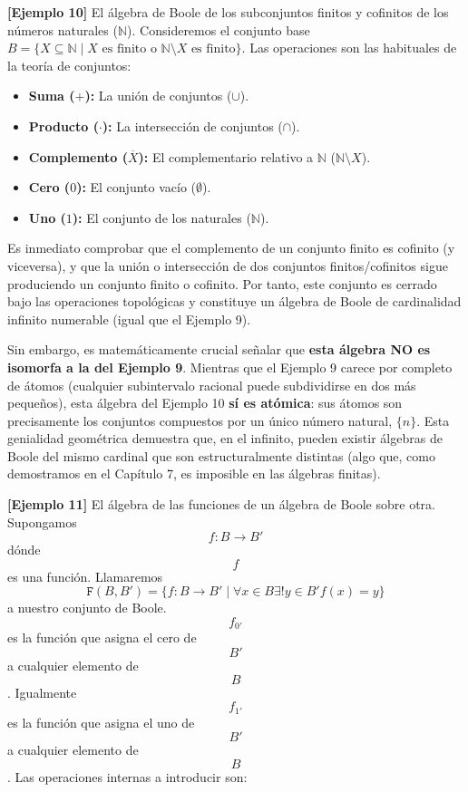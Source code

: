  \textbf{{[}Ejemplo 10{]}} El álgebra de Boole de los subconjuntos finitos y cofinitos de los números naturales ($\mathbb{N}$). Consideremos el conjunto base $B = \{ X \subseteq \mathbb{N} \mid X \text{ es finito o } \mathbb{N} \setminus X \text{ es finito} \}$. Las operaciones son las habituales de la teoría de conjuntos:
  \begin{itemize}
      \item \textbf{Suma ($+$):} La unión de conjuntos ($\cup$).
      \item \textbf{Producto ($\cdot$):} La intersección de conjuntos ($\cap$).
      \item \textbf{Complemento ($\overline{X}$):} El complementario relativo a $\mathbb{N}$ ($\mathbb{N} \setminus X$).
      \item \textbf{Cero ($0$):} El conjunto vacío ($\emptyset$).
      \item \textbf{Uno ($1$):} El conjunto de los naturales ($\mathbb{N}$).
  \end{itemize}
  Es inmediato comprobar que el complemento de un conjunto finito es cofinito (y viceversa), y que la unión o intersección de dos conjuntos finitos/cofinitos sigue produciendo un conjunto finito o cofinito. Por tanto, este conjunto es cerrado bajo las operaciones topológicas y constituye un álgebra de Boole de cardinalidad infinito numerable (igual que el Ejemplo 9).

  Sin embargo, es matemáticamente crucial señalar que \textbf{esta álgebra NO es isomorfa a la del Ejemplo 9}. Mientras que el Ejemplo 9 carece por completo de átomos (cualquier subintervalo racional puede subdividirse en dos más pequeños), esta álgebra del Ejemplo 10 \textbf{sí es atómica}: sus átomos son precisamente los conjuntos compuestos por un único número natural, $\{n\}$. Esta genialidad geométrica demuestra que, en el infinito, pueden existir álgebras de Boole del mismo cardinal que son estructuralmente distintas (algo que, como demostramos en el Capítulo 7, es imposible en las álgebras finitas).

  \textbf{{[}Ejemplo 11{]}} El álgebra de las funciones de un álgebra de
  Boole sobre otra. Supongamos \[f:{B\rightarrow B}'\]dónde \[f\] es una
  función. Llamaremos
  \[{\mathtt{F}{({B,B'})}} = {\{{f:{B\rightarrow B}' \mid \forall{x \in B}\exists!{y \in B}'f{{(x)} = y}}\}}\]
  a nuestro conjunto de Boole. \[f_{0'}\] es la función que asigna el
  cero de \[B'\] a cualquier elemento de \[B\]. Igualmente \[f_{1'}\] es
  la función que asigna el uno de \[B'\] a cualquier elemento de \[B\].
  Las operaciones internas a introducir son:

